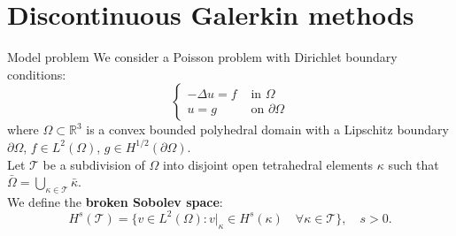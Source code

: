 \documentclass{beamer}
\begin{document}
\section[DG methods]{Discontinuous Galerkin methods}
\begin{frame}{Model problem}
	We consider a Poisson problem with Dirichlet boundary conditions:
	\begin{equation*}\begin{cases}
		-\Delta u= f& \mbox{ in } \Omega\\
		u = g& \mbox{ on } \partial \Omega
	\end{cases}\end{equation*}
	where $\Omega \subset \mathbb{R}^3$ is a convex bounded polyhedral domain
	with
	a Lipschitz boundary $\partial \Omega$, $f \in L^2(\Omega)$, $g \in
	H^{1/2}(\partial \Omega)$.\\
	\vspace*{0.5cm}
	Let $\mathcal{T}$ be a subdivision of $\Omega$ into disjoint open
	tetrahedral elements $\kappa$ such that $\bar{\Omega} =
	\bigcup\limits_{\kappa \in \mathcal{T}} \bar{\kappa}$.\\
	We define the \textbf{broken Sobolev space}:
	\begin{equation*}
		H^s(\mathcal{T}) = \{ v \in L^2(\Omega) : v|_\kappa \in H^s(\kappa)
		\quad \forall \kappa \in \mathcal{T} \}, \quad s>0.
	\end{equation*}
\end{frame}
\end{document}

